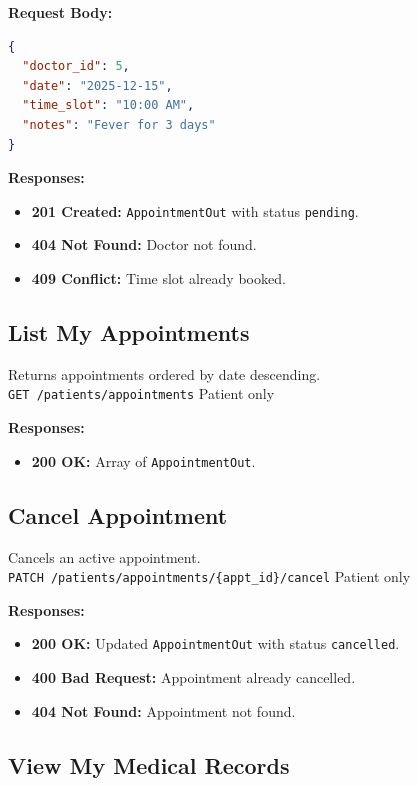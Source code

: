 \documentclass[a4paper,12pt]{report}
\begin{document}
\noindent\textbf{Request Body:}
\begin{lstlisting}[language=json]
{
  "doctor_id": 5,
  "date": "2025-12-15",
  "time_slot": "10:00 AM",
  "notes": "Fever for 3 days"
}
\end{lstlisting}

\noindent\textbf{Responses:}
\begin{itemize}
    \item \textbf{201 Created:} \texttt{AppointmentOut} with status \texttt{pending}.
    \item \textbf{404 Not Found:} Doctor not found.
    \item \textbf{409 Conflict:} Time slot already booked.
\end{itemize}

\subsection{List My Appointments}

Returns appointments ordered by date descending. \\
\texttt{GET /patients/appointments} \hfill Patient only

\noindent\textbf{Responses:}
\begin{itemize}
    \item \textbf{200 OK:} Array of \texttt{AppointmentOut}.
\end{itemize}

\subsection{Cancel Appointment}

Cancels an active appointment. \\
\texttt{PATCH /patients/appointments/\{appt\_id\}/cancel} \hfill Patient only

\noindent\textbf{Responses:}
\begin{itemize}
    \item \textbf{200 OK:} Updated \texttt{AppointmentOut} with status \texttt{cancelled}.
    \item \textbf{400 Bad Request:} Appointment already cancelled.
    \item \textbf{404 Not Found:} Appointment not found.
\end{itemize}

\subsection{View My Medical Records}
\end{document}
